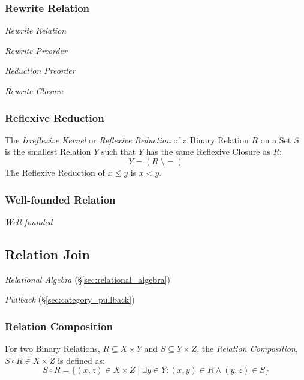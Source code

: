 \subsubsection{Rewrite Relation}\label{sec:rewrite_relation}

\emph{Rewrite Relation}

\emph{Rewrite Preorder}

\emph{Reduction Preorder}

\emph{Rewrite Closure}



\subsubsection{Reflexive Reduction}\label{sec:reflexive_reduction}

The \emph{Irreflexive Kernel} or \emph{Reflexive Reduction} of a
Binary Relation $R$ on a Set $S$ is the smallest Relation $Y$
such that $Y$ has the same Reflexive Closure as $R$:
\[
    Y = (R\;\setminus=)
\]
The Reflexive Reduction of $x \leq y$ is $x < y$.



\subsubsection{Well-founded Relation}\label{sec:well_founded}

\emph{Well-founded}



\subsection{Relation Join}\label{sec:relation_join}

\emph{Relational Algebra} (\S\ref{sec:relational_algebra})

\emph{Pullback} (\S\ref{sec:category_pullback})



\subsubsection{Relation Composition}\label{sec:relation_composition}

For two Binary Relations, $R \subseteq X \times Y$ and $S \subseteq Y
\times Z$, the \emph{Relation Composition}, $S \circ R \in X \times Z$
is defined as:
\[
    S \circ R = \{(x,z) \in X \times Z \;|\;
    \exists y \in Y : (x,y) \in R \wedge (y,z) \in S \}
\]




